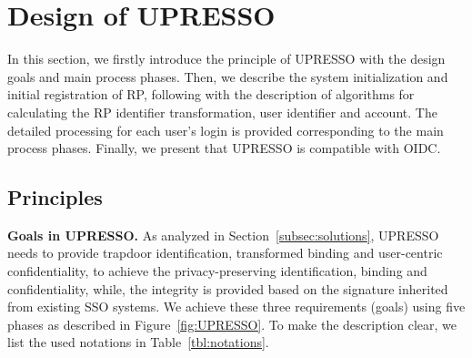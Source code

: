 ﻿\section{Design of UPRESSO}
\label{sec:UPRESSO}
In this section, we firstly introduce the principle of UPRESSO with the design goals and main process phases.
Then, we describe the system initialization and initial registration of RP, following with the description of algorithms for calculating the RP identifier transformation, user identifier and account.
The detailed processing for each user's login is provided corresponding to the main process phases.
Finally, we present that UPRESSO is compatible with OIDC.

\subsection{Principles}
\label{subsec:overview}
\noindent\textbf{Goals in UPRESSO.}
As analyzed in Section~\ref{subsec:solutions}, UPRESSO needs to provide trapdoor identification, transformed binding and user-centric confidentiality,
to achieve the privacy-preserving identification, binding and confidentiality,
while, the integrity is provided based on the signature inherited from existing SSO systems.
We %
achieve these three requirements (goals) using five phases as described in Figure~\ref{fig:UPRESSO}.
To make the description clear, we list the used notations  in Table~\ref{tbl:notations}.
